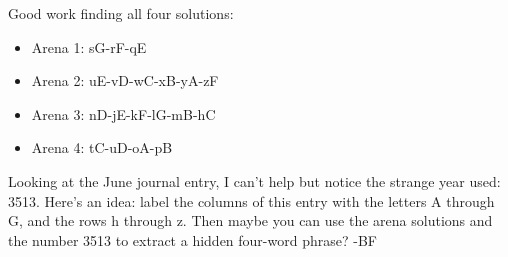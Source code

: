 Good work finding all four solutions:

\begin{itemize}
\item Arena 1: sG-rF-qE
\item Arena 2: uE-vD-wC-xB-yA-zF
\item Arena 3: nD-jE-kF-lG-mB-hC
\item Arena 4: tC-uD-oA-pB
\end{itemize}

Looking at the June journal entry, I can't help but notice
the strange year used: 3513. 
Here's an idea: label the columns of this entry
with the letters A through G, and the rows h through z. Then
maybe you can use the arena solutions and the number 3513
to extract a hidden four-word phrase? -BF
